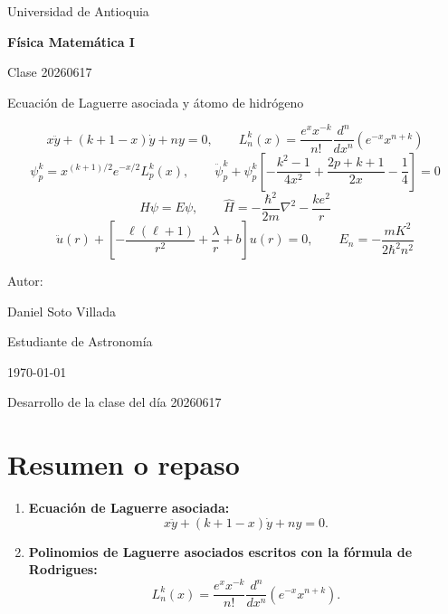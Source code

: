 \documentclass[a4paper]{article}
\begin{document}

\begin{titlepage}
  \thispagestyle{empty}
  \centering
  {\Large Universidad de Antioquia\par}
  \vspace{2cm}
  {\huge\bfseries Física Matemática I\par}
  \vspace{0.4cm}
  {\Large Clase 20260617\par}
  \vspace{0.8cm}
  {\large Ecuación de Laguerre asociada y átomo de hidrógeno\par}
  \vspace{1.0cm}
  \begin{tcolorbox}[
    colback=blue!3,
    colframe=blue!45!black,
    width=0.88\textwidth,
    arc=2mm,
    boxrule=0.7pt,
    title={Ecuaciones principales},
    fonttitle=\bfseries,
    halign=center
  ]
  $$
  x\ddot{y}+(k+1-x)\dot{y}+ny=0,
  \qquad
  L_n^k(x)=\frac{e^x x^{-k}}{n!}\frac{d^n}{dx^n}\left(e^{-x}x^{n+k}\right)
  $$
  $$
  \psi_p^k=x^{(k+1)/2}e^{-x/2}L_p^k(x),
  \qquad
  \ddot{\psi}_p^k+\psi_p^k\left[-\frac{k^2-1}{4x^2}+\frac{2p+k+1}{2x}-\frac14\right]=0
  $$
  $$
  \hat{H}\psi=E\psi,
  \qquad
  \hat{H}=-\frac{\hbar^2}{2m}\nabla^2-\frac{ke^2}{r}
  $$
  $$
  \ddot{u}(r)+\left[-\frac{\ell(\ell+1)}{r^2}+\frac{\lambda}{r}+b\right]u(r)=0,
  \qquad
  E_n=-\frac{mK^2}{2\hbar^2 n^2}
  $$
  \end{tcolorbox}
  \vspace{0.9cm}
  {\large Autor:\par}
  \vspace{0.2cm}
  {\large Daniel Soto Villada\par}
  {\large Estudiante de Astronomía\par}
  \vfill
  {\large \today\par}
\end{titlepage}

\setcounter{page}{1}
\newpage
\tableofcontents
\newpage
{}

Desarrollo de la clase del día 20260617

\section{Resumen o repaso}

\begin{enumerate}
\item \textbf{Ecuación de Laguerre asociada:}
\[
x\ddot{y} + (k + 1 - x)\dot{y} + ny = 0.
\]
\item \textbf{Polinomios de Laguerre asociados escritos con la fórmula de Rodrigues:}
\[
L_n^k(x) = \frac{e^x x^{-k}}{n!} \frac{d^n}{dx^n} (e^{-x} x^{n+k}).
\]
\end{enumerate}
\end{document}

